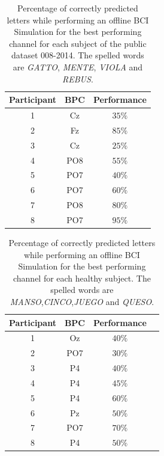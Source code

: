 \documentclass[utf8]{frontiersSCNS} %
\begin{document}

\begin{table}[htb]
\caption{Percentage of correctly predicted letters while performing an offline BCI Simulation for the best performing channel for each subject of the public dataset 008-2014. The spelled words are \textit{GATTO}, \textit{MENTE}, \textit{VIOLA} and \textit{REBUS}. }
\centering
\begin{tabular}{ccc}
\toprule
\textbf{Participant}	&  \textbf{BPC}	& \textbf{Performance}\\
\midrule
1     &     Cz   &   $35\%$  \\
2     &     Fz   &   $85\%$  \\
3     &     Cz   &   $25\%$  \\
4     &     PO8 &   $55\%$  \\
5     &     PO7 &   $40\%$ \\
6     &     PO7 &   $60\%$  \\
7     &     PO8 &   $80\%$  \\
8     &     PO7 &   $95\%$ \\

\end{tabular}
\label{tab:results}
\end{table}


\begin{table}[htb]
\caption{Percentage of correctly predicted letters while performing an offline BCI Simulation for the best performing channel for each healthy subject. The spelled words are \textit{MANSO},\textit{CINCO},\textit{JUEGO} and \textit{QUESO}. }
\centering
\begin{tabular}{cccc}
\toprule
\textbf{Participant}	&  \textbf{BPC}	& \textbf{Performance}\\
\midrule
1     &     Oz   &     $40\%$  \\
2     &     PO7   &     $30\%$ \\
3     &     P4   &     $40\%$ \\
4     &     P4   &     $45\%$ \\
5     &     P4   &      $60\%$ \\
6     &     Pz   &      $50\%$ \\
7     &     PO7   &      $70\%$ \\
8     &     P4   &      $50\%$ \\

\end{tabular}
\label{tab:resultsowndataset}
\end{table}
\end{document}

